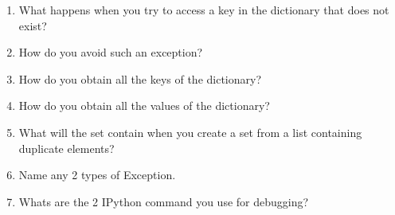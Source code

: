 \documentclass[a4paper,10pt]{book}
\begin{document}
\begin{enumerate}
  \item What happens when you try to access a key in the dictionary that does not exist?
  \item How do you avoid such an exception?
  \item How do you obtain all the keys of the dictionary?
  \item How do you obtain all the values of the dictionary?
  \item What will the set contain when you create a set from a list containing duplicate elements?
  \item Name any 2 types of Exception.
  \item Whats are the 2 IPython command you use for debugging?
\end{enumerate}
\end{document}

